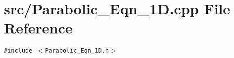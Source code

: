 \section{src/Parabolic\_\-Eqn\_\-1D.cpp File Reference}
\label{Parabolic__Eqn__1D_8cpp}
{\tt \#include $<$Parabolic\_\-Eqn\_\-1D.h$>$}\par
